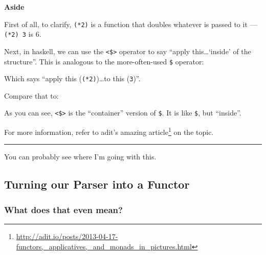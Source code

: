 \documentclass[]{article}
\newenvironment{Shaded}{}{}
\newcommand{\DataTypeTok}[1]{\textcolor[rgb]{0.56,0.13,0.00}{{#1}}}
\newcommand{\DecValTok}[1]{\textcolor[rgb]{0.25,0.63,0.44}{{#1}}}
\newcommand{\FunctionTok}[1]{\textcolor[rgb]{0.02,0.16,0.49}{{#1}}}
\newcommand{\NormalTok}[1]{{#1}}
\renewcommand{\href}[2]{#2\footnote{\url{#1}}}
\begin{document}
\textbf{Aside}

First of all, to clarify, \texttt{(*2)} is a function that doubles
whatever is passed to it --- \texttt{(*2)\ 3} is 6.

Next, in haskell, we can use the \texttt{\textless{}\$\textgreater{}}
operator to say ``apply this\ldots{}`inside' of the structure''. This is
analogous to the more-often-used \texttt{\$} operator:

\begin{Shaded}
\end{Shaded}

Which says ``apply this (\texttt{(*2)})\ldots{}to this (\texttt{3})''.

Compare that to:

\begin{Shaded}
\end{Shaded}

As you can see, \texttt{\textless{}\$\textgreater{}} is the
``container'' version of \texttt{\$}. It is like \texttt{\$}, but
``inside''.

For more information, refer to adit's
\href{http://adit.io/posts/2013-04-17-functors,_applicatives,_and_monads_in_pictures.html}{amazing
article} on the topic.

\begin{center}\rule{0.5\linewidth}{\linethickness}\end{center}

You can probably see where I'm going with this.

\subsection{Turning our Parser into a
Functor}\label{turning-our-parser-into-a-functor}

\subsubsection{What does that even
mean?}\label{what-does-that-even-mean}
\end{document}
